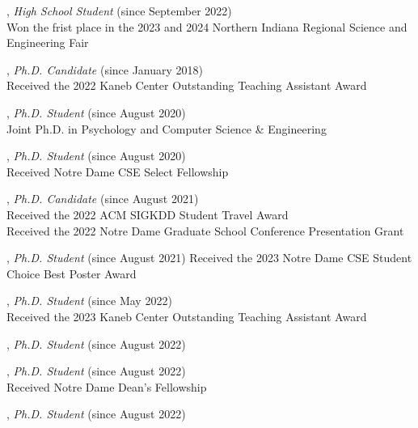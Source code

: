 \documentclass[10pt]{article}
\newenvironment{myindentpar}[1]%
{\begin{list}{}%
         {\setlength{\leftmargin}{#1}}%
         \item[]%
}
{\end{list}}
\newcounter{list}
\begin{document}
\begin{myindentpar}{0.75cm}

\hspace{-0.75cm}{\bf Albert Lu}, \textit{High School Student} (since September 2022) \\
	{Won the frist place in the 2023 and 2024 Northern Indiana Regional Science and Engineering Fair}
	
\hspace{-0.75cm}{\bf Qingkai Zeng}, \textit{Ph.D. Candidate} (since January 2018) \\
	{Received the 2022 Kaneb Center Outstanding Teaching Assistant Award}

\hspace{-0.75cm}{\bf Ms. Lingbo Tong}, \textit{Ph.D. Student} (since August 2020) \\
	{Joint Ph.D. in Psychology and Computer Science \& Engineering}

\hspace{-0.75cm}{\bf Ms. Mengxia Yu}, \textit{Ph.D. Student} (since August 2020) \\
	{Received Notre Dame CSE Select Fellowship}

\hspace{-0.75cm}{\bf Gang Liu}, \textit{Ph.D. Candidate} (since August 2021) \\
	{Received the 2022 ACM SIGKDD Student Travel Award} \\
	{Received the 2022 Notre Dame Graduate School Conference Presentation Grant}

\hspace{-0.75cm}{\bf Zhihan Zhang}, \textit{Ph.D. Student} (since August 2021)
	{Received the 2023 Notre Dame CSE Student Choice Best Poster Award}

\hspace{-0.75cm}{\bf Noah Ziems}, \textit{Ph.D. Student} (since May 2022) \\
	{Received the 2023 Kaneb Center Outstanding Teaching Assistant Award}

\hspace{-0.75cm}{\bf Hy Dang}, \textit{Ph.D. Student} (since August 2022)

\hspace{-0.75cm}{\bf Eric Inae}, \textit{Ph.D. Student} (since August 2022) \\
	{Received Notre Dame Dean's Fellowship}

\hspace{-0.75cm}{\bf Bang Nguyen}, \textit{Ph.D. Student} (since August 2022)


\end{myindentpar}
\end{document}
